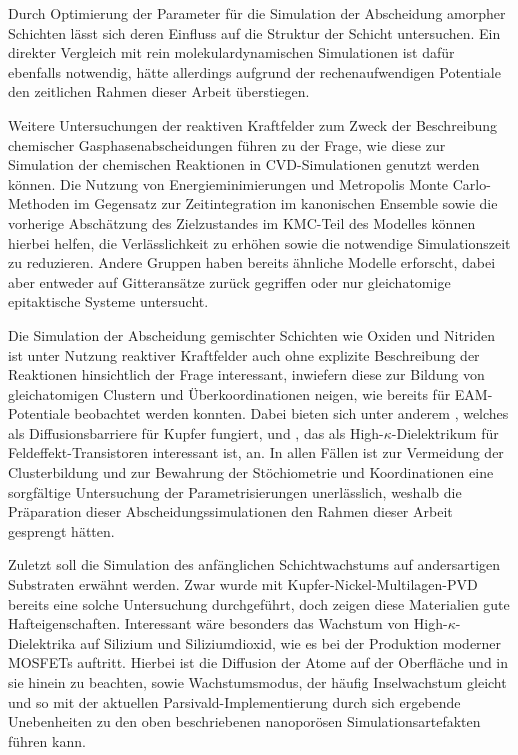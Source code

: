 Durch Optimierung der Parameter für die Simulation der Abscheidung amorpher Schichten lässt sich deren Einfluss auf die Struktur der Schicht untersuchen.
Ein direkter Vergleich mit rein molekulardynamischen Simulationen ist dafür ebenfalls notwendig, hätte allerdings aufgrund der rechenaufwendigen Potentiale den zeitlichen Rahmen dieser Arbeit überstiegen.

Weitere Untersuchungen der reaktiven Kraftfelder zum Zweck der Beschreibung chemischer Gasphasenabscheidungen führen zu der Frage, wie diese zur Simulation der chemischen Reaktionen in CVD-Simulationen genutzt werden können.
Die Nutzung von Energieminimierungen und Metropolis Monte Carlo-Methoden im Gegensatz zur Zeitintegration im kanonischen Ensemble sowie die vorherige Abschätzung des Zielzustandes im KMC-Teil des Modelles können hierbei helfen, die Verlässlichkeit zu erhöhen sowie die notwendige Simulationszeit zu reduzieren.
Andere Gruppen haben bereits ähnliche Modelle erforscht, dabei aber entweder auf Gitteransätze zurück gegriffen\cite{stamatakis_graph-theoretical_2011} oder nur gleichatomige epitaktische Systeme untersucht\cite{clark_hybrid_1996}.

Die Simulation der Abscheidung gemischter Schichten wie Oxiden und Nitriden ist unter Nutzung reaktiver Kraftfelder auch ohne explizite Beschreibung der Reaktionen hinsichtlich der Frage interessant, inwiefern diese zur Bildung von gleichatomigen Clustern und Überkoordinationen neigen, wie bereits für EAM-Potentiale beobachtet werden konnten\cite{lorenz_entwicklung_2012}.
Dabei bieten sich unter anderem , welches als Diffusionsbarriere für Kupfer fungiert, und , das als High-$\kappa$-Dielektrikum für Feldeffekt-Transistoren interessant ist, an.
In allen Fällen ist zur Vermeidung der Clusterbildung und zur Bewahrung der Stöchiometrie und Koordinationen eine sorgfältige Untersuchung der Parametrisierungen unerlässlich, weshalb die Präparation dieser Abscheidungssimulationen den Rahmen dieser Arbeit gesprengt hätten.

Zuletzt soll die Simulation des anfänglichen Schichtwachstums auf andersartigen Substraten erwähnt werden.
Zwar wurde mit Kupfer-Nickel-Multilagen-PVD bereits eine solche Untersuchung durchgeführt, doch zeigen diese Materialien gute Hafteigenschaften.
Interessant wäre besonders das Wachstum von High-$\kappa$-Dielektrika auf Silizium und Siliziumdioxid, wie es bei der Produktion moderner MOSFETs auftritt.
Hierbei ist die Diffusion der Atome auf der Oberfläche und in sie hinein zu beachten, sowie Wachstumsmodus, der häufig Inselwachstum gleicht und so mit der aktuellen Parsivald-Implementierung durch sich ergebende Unebenheiten zu den oben beschriebenen nanoporösen Simulationsartefakten führen kann.

